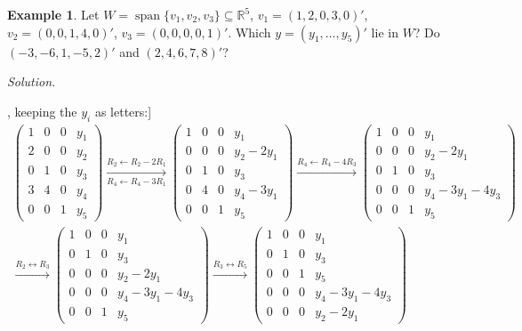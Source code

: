 \documentclass[12pt]{article}
\newcommand{\R}{\mathbb R}
\DeclareMathOperator{\Span}{span}
\theoremstyle{definition}
\newtheorem{example}[theorem]{Example}
\begin{document}
\begin{example}\label{b3.8}
Let \(W=\Span\{v_1,v_2,v_3\}\subseteq\R^5\), \(v_1=(1,2,0,3,0)'\), \(v_2=(0,0,1,4,0)'\), \(v_3=(0,0,0,0,1)'\). Which
\(y=(y_1,\dots,y_5)'\) lie in \(W\)? Do \((-3,-6,1,-5,2)'\) and \((2,4,6,7,8)'\)?
\end{example}
\textit{Solution.}
\begin{board}[Row-reduce \([v_1\ v_2\ v_3\mid y]\), keeping the \(y_i\) as letters:]
\[
\begin{gathered}
\left(\begin{array}{ccc|c}1&0&0&y_1\\2&0&0&y_2\\0&1&0&y_3\\3&4&0&y_4\\0&0&1&y_5\end{array}\right)
\xrightarrow[R_4\leftarrow R_4-3R_1]{R_2\leftarrow R_2-2R_1}
\left(\begin{array}{ccc|c}1&0&0&y_1\\0&0&0&y_2-2y_1\\0&1&0&y_3\\0&4&0&y_4-3y_1\\0&0&1&y_5\end{array}\right)
\xrightarrow{R_4\leftarrow R_4-4R_3}
\left(\begin{array}{ccc|c}1&0&0&y_1\\0&0&0&y_2-2y_1\\0&1&0&y_3\\0&0&0&y_4-3y_1-4y_3\\0&0&1&y_5\end{array}\right)
\\
\xrightarrow{R_2\leftrightarrow R_3}
\left(\begin{array}{ccc|c}1&0&0&y_1\\0&1&0&y_3\\0&0&0&y_2-2y_1\\0&0&0&y_4-3y_1-4y_3\\0&0&1&y_5\end{array}\right)
\xrightarrow{R_3\leftrightarrow R_5}
\left(\begin{array}{ccc|c}1&0&0&y_1\\0&1&0&y_3\\0&0&1&y_5\\0&0&0&y_4-3y_1-4y_3\\0&0&0&y_2-2y_1\end{array}\right)
\end{gathered}
\]
\end{board}
\end{document}

